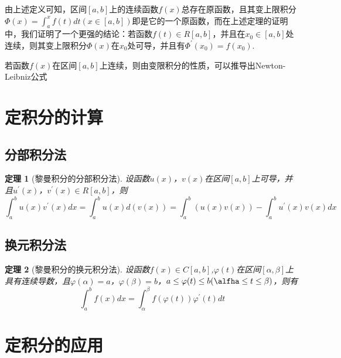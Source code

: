 \documentclass[12pt, a4paper, oneside]{ctexart}
\newtheorem{theorem}{定理}[section]
\begin{document}
由上述定义可知，区间$[a,b]$上的连续函数$f(x)$总存在原函数，且其变上限积分$\Phi(x)=\int_a^xf(t)dt(x\in [a,b])$即是它的一个原函数，而在上述定理的证明中，我们证明了一个更强的结论：若函数$f(t)\in R[a,b]$，并且在$x_0 \in [a,b]$处连续，则其变上限积分$\Phi(x)$在$x_0$处可导，并且有$\Phi^{\prime}(x_0)=f(x_0)$.

\begin{remark}
若函数$f(x)$在区间$[a,b]$上连续，则由变限积分的性质，可以推导出Newton-Leibniz公式
\end{remark}

\section{定积分的计算}

\subsection{分部积分法}
\begin{theorem}[黎曼积分的分部积分法]
设函数$u(x)$，$v(x)$在区间$[a,b]$上可导，并且$u^{\prime}(x)$，$v^{\prime}(x)\in R[a,b]$，则
\begin{equation*}
    \int_a^bu(x)v^{\prime}(x)dx=\int_a^bu(x)d(v(x))=\int_a^b\left(u(x)v(x)\right)-\int_a^bu^{\prime}(x)v(x)dx
\end{equation*}
\end{theorem}

\subsection{换元积分法}

\begin{theorem}[黎曼积分的换元积分法]
设函数$f(x)\in C[a,b]$,$\varphi(t)$在区间$[\alpha,\beta]$上具有连续导数，且$\varphi(\alpha)=a$，$\varphi(\beta)=b$，$a\leq \varphi(t)\leq b(\alfha \leq t \leq \beta )$，则有
\begin{equation*}
    \int_a^bf(x)dx=\int_{\alpha}^{\beta}f(\varphi(t))\varphi^{\prime}(t)dt
\end{equation*}

\end{theorem}

\section{定积分的应用}
\end{document}

